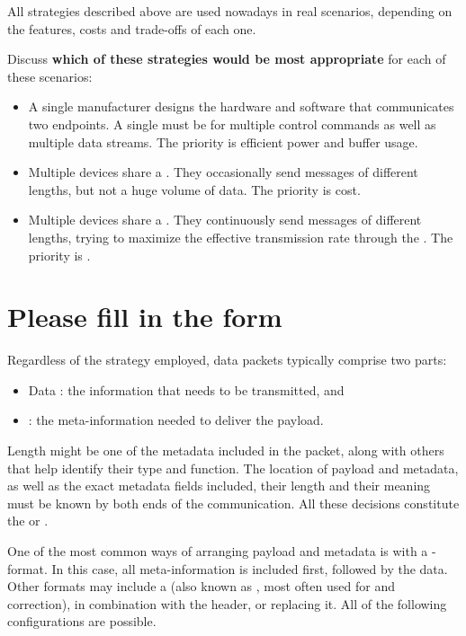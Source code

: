 \begin{exercise}
All strategies described above are used nowadays in real scenarios, depending on the 
features, costs and trade-offs of each one.

Discuss \textbf{which of these strategies would be most appropriate} for each of these scenarios:
\begin{itemize}
\item A single manufacturer designs the hardware and software that communicates two endpoints.
A single  must be  for multiple control commands
as well as multiple data streams. The priority is efficient power and buffer usage.

\item Multiple devices share a . They occasionally send messages of different lengths,
but not a huge volume of data. The priority is cost.

\item Multiple devices share a . They continuously send messages of different lengths,
trying to maximize the effective transmission rate through the . 
The priority is .
\end{itemize}
\end{exercise}

\section{Please fill in the form}\label{sec:packets:format}

Regardless of the strategy employed, data packets typically comprise two parts: 
\begin{itemize}
 \item Data : the information that needs to be transmitted, and
 \item {}: the meta-information needed to deliver the payload.
\end{itemize}
Length might be one of the metadata  included in the packet, along with 
others that help identify their type and function.
% 
The location of payload and metadata, as well as the exact metadata fields included, their length and their meaning
must be known by both ends of the communication. All these decisions constitute the 
or .

One of the most common ways of arranging payload and metadata is with a - format.
In this case, all meta-information is included first, followed by the data. 
Other formats may include a  (also known as , most often used for 
and correction), in combination with the header, or replacing it.
All of the following configurations are possible.

